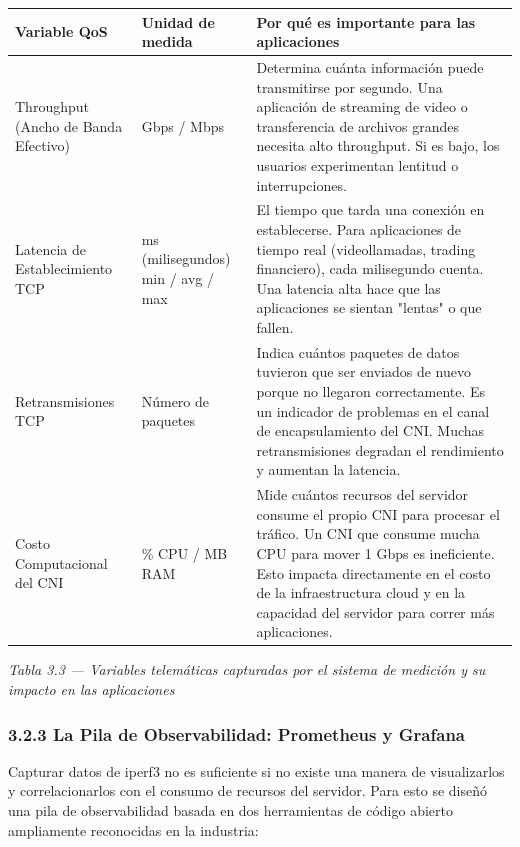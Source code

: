 \documentclass[journal]{IEEEtran}
\begin{document}
\begin{table}[htbp]
\centering
\scriptsize
\begin{tabularx}{\textwidth}{|Y|Y|Y|}
\hline
\textbf{Variable QoS} & \textbf{Unidad de medida} & \textbf{Por qué es importante para las aplicaciones} \\
\hline
Throughput (Ancho de Banda Efectivo) & Gbps / Mbps & Determina cuánta información puede transmitirse por segundo. Una aplicación de streaming de video o transferencia de archivos grandes necesita alto throughput. Si es bajo, los usuarios experimentan lentitud o interrupciones. \\
Latencia de Establecimiento TCP & ms (milisegundos) min / avg / max & El tiempo que tarda una conexión en establecerse. Para aplicaciones de tiempo real (videollamadas, trading financiero), cada milisegundo cuenta. Una latencia alta hace que las aplicaciones se sientan "lentas" o que fallen. \\
Retransmisiones TCP & Número de paquetes & Indica cuántos paquetes de datos tuvieron que ser enviados de nuevo porque no llegaron correctamente. Es un indicador de problemas en el canal de encapsulamiento del CNI. Muchas retransmisiones degradan el rendimiento y aumentan la latencia. \\
Costo Computacional del CNI & \% CPU / MB RAM & Mide cuántos recursos del servidor consume el propio CNI para procesar el tráfico. Un CNI que consume mucha CPU para mover 1 Gbps es ineficiente. Esto impacta directamente en el costo de la infraestructura cloud y en la capacidad del servidor para correr más aplicaciones. \\
\hline
\end{tabularx}
\end{table}

\begin{center}\emph{\emph{Tabla 3.3 --- Variables telemáticas capturadas por el sistema de medición y su impacto en las aplicaciones}}\end{center}

\subsubsection{3.2.3 La Pila de Observabilidad: Prometheus y Grafana}

Capturar datos de iperf3 no es suficiente si no existe una manera de visualizarlos y correlacionarlos con el consumo de recursos del servidor. Para esto se diseñó una pila de observabilidad basada en dos herramientas de código abierto ampliamente reconocidas en la industria:
\end{document}
